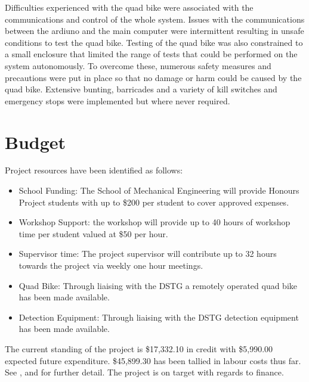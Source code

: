 \documentclass[main.tex]{subfiles}
\begin{document}
Difficulties experienced with the quad bike were associated with the communications and control of the  whole system. Issues with the communications between the ardiuno and the main computer were intermittent resulting in unsafe conditions to test the quad bike. Testing of the quad bike was also constrained to a small enclosure that limited the range of tests that could be performed on the system autonomously. To overcome these, numerous safety measures and precautions were put in place so that no damage or harm could be caused by the quad bike. Extensive bunting, barricades and a variety of kill switches and emergency stops were implemented but where never required. 

\section{Budget}
Project resources have been identified as follows:
\begin{itemize}
\item School Funding: The School of Mechanical Engineering will provide Honours Project students with up to \$200 per student to cover approved expenses.
\item Workshop Support: the workshop will provide up to 40 hours of workshop time per student valued at \$50 per hour.
\item Supervisor time: The project supervisor will contribute up to 32 hours towards the project via weekly one hour meetings.
\item Quad Bike: Through liaising with the DSTG a remotely operated quad bike has been made available.
\item Detection Equipment: Through liaising with the DSTG detection equipment has been made available.
\end{itemize}
The current standing of the project is \$17,332.10 in credit with \$5,990.00 expected future expenditure. \$45,899.30 has been tallied in labour costs thus far. See , and  for further detail. The project is on target with regards to finance.
\end{document}
